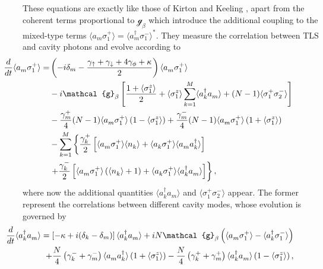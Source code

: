 \documentclass[12pt, a4paper]{iopart}
\newcommand{\avg}[1]{\langle{#1}\rangle}
\begin{document}
%
These equations are exactly like those of Kirton and Keeling \cite{Keeling_PRL-nonequilibrium_model_photon-cond,Keeling-Thermalization_photon_condensate}, apart from the coherent terms proportional to $\mathcal{g}_\beta$ which introduce the additional coupling to the mixed-type terms $\avg{a_m^{}\sigma^+_1}=\avg{a^\dag_m\sigma^-_1}^*$. They measure the correlation between TLS and cavity photons and evolve according to
%
\begin{eqnarray}
\hspace*{-2cm}
\frac{d}{dt}\avg{a_m^{}\sigma^+_1}=&\left(-i\delta_m-\frac{\gamma_\uparrow+\gamma_\downarrow+4\gamma_\phi+\kappa}{2}\right)\avg{a_m^{}\sigma^+_1}\nonumber\\
\hspace*{-2cm}
&-i\mathcal{g}_\beta\left[\frac{1+\avg{\sigma^z_1}}{2}+\avg{\sigma^z_1}\sum_{k=1}^M\avg{a^\dag_k a_m^{}}+(N-1)\avg{\sigma^+_1\sigma^-_2}\right]\nonumber\\
\hspace*{-2cm}
&-\frac{\gamma^+_m}{4}(N-1)\avg{a_m^{}\sigma^+_1}\left(1-\avg{\sigma^z_1}\right)
+\frac{\gamma^-_m}{4}(N-1)\avg{a_m^{}\sigma^+_1}\left(1+\avg{\sigma^z_1}\right)\nonumber\\
\hspace*{-2cm}
&-\sum_{k=1}^M\left\{\frac{\gamma^+_k}{2}\left[\avg{a_m^{}\sigma^+_1}\avg{n_k^{}}+\avg{a_k^{}\sigma^+_1}{\avg{a_m^{} a^\dag_k}}\right]\right.\nonumber\\
\hspace*{-2cm}
&\left.+\frac{\gamma^-_k}{2}\left[\avg{a_m^{}\sigma^+_1}\left(\avg{n_k^{}}+1\right)+\avg{a_k^{}\sigma^+_1}\avg{a^\dag_k a_m^{}}\right]\right\},\label{eq:MainSys-3}
\end{eqnarray}
%
where now the additional quantities $\avg{a_k^\dag a_m^{}}$ and $\avg{\sigma^+_1\sigma^-_2}$ appear. The former represent the correlations between different cavity modes, whose evolution is governed by
%
\begin{eqnarray}
\hspace*{-2.4cm}
\frac{d}{dt}\avg{a_k^\dag a_m^{}}=\left[-\kappa+i(\delta_k-\delta_m)\right]\avg{a^\dag_k a_m^{}}
+iN \mathcal{g}_\beta\left(\avg{a_m^{}\sigma^+_1}-\avg{a^\dag_k\sigma^-_1}\right)\nonumber\\
\hspace*{-0.2cm}
+\frac{N}{4}\left(\gamma^-_k+\gamma^-_m\right)\avg{a_m^{}a^\dag_k}\left(1+\avg{\sigma^z_1}\right)-\frac{N}{4}\left(\gamma^+_k+\gamma^+_m\right)\avg{a^\dag_k a_m^{}}\left(1-\avg{\sigma^z_1}\right),\label{eq:MainSys-4}
\end{eqnarray}
\end{document}
